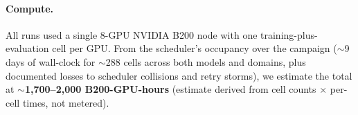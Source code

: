 \documentclass[11pt]{article}
\begin{document}
\paragraph{Compute.} All runs used a single 8-GPU NVIDIA B200 node with one
training-plus-evaluation cell per GPU. From the scheduler's occupancy over the
campaign ($\sim$9 days of wall-clock for $\sim$288 cells across both models and
domains, plus documented losses to scheduler collisions and retry storms), we
estimate the total at \textbf{$\sim$1{,}700--2{,}000 B200-GPU-hours} (estimate
derived from cell counts $\times$ per-cell times, not metered).
\end{document}
